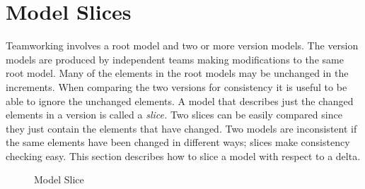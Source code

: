 \section{Model Slices}

Teamworking involves a root model and two or more version models.
The version models are produced by independent teams making modifications
to the same root model. Many of the elements in the root models may
be unchanged in the increments. When comparing the two versions for
consistency it is useful to be able to ignore the unchanged elements.
A model that describes just the changed elements in a version is called
a \textit{slice.} Two slices can be easily compared since they just
contain the elements that have changed. Two models are inconsistent
if the same elements have been changed in different ways; slices make
consistency checking easy. This section describes how to slice a model
with respect to a delta.

%
\begin{figure}
\begin{center}

\hfill{}


\caption{Model Slice\label{fig:Model-Slice}}

\end{center}
\end{figure}


